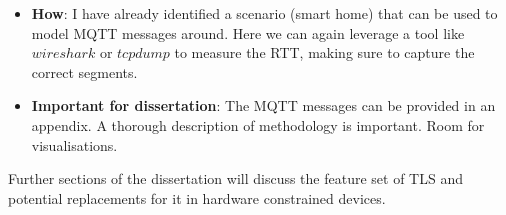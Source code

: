 \documentclass[a4paper,11pt]{article}
\begin{document}
\begin{itemize}
\begin{itemize}
        \item \textbf{How}: I have already identified a scenario (smart home) that can be used to model MQTT messages around. Here we can again leverage a tool like $wireshark$ or $tcpdump$ to measure the RTT, making sure to capture the correct segments.
        \item \textbf{Important for dissertation}: The MQTT messages can be provided in an appendix. A thorough description of methodology is important. Room for visualisations.
    \end{itemize}
\end{itemize}

Further sections of the dissertation will discuss the feature set of TLS and potential replacements for it in hardware constrained devices.

\medskip
\nocite{*}
\printbibliography
\end{document}
